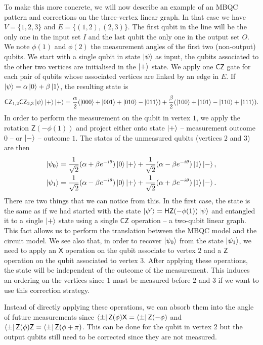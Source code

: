 \documentclass[12pt]{iopart}
\newcommand{\cptp}[1]{\mathsf{#1}} \newcommand{\pd}[1]{\mathcal{#1}}  \newcommand{\sch}[1]{\bm{#1}}
\newcommand{\X}{\cptp{X}}
\newcommand{\Z}{\cptp{Z}}
\newcommand{\Ha}{\cptp{H}}
\renewcommand{\1}{\mathds{1}}
\newcommand{\CZ}{\mathsf{CZ}}
\begin{document}
To make this more concrete, we will now describe an example of an MBQC pattern and corrections on the three-vertex linear graph. In that case we have $V = \{1, 2, 3\}$ and $E = \{(1, 2), (2, 3)\}$. The first qubit in the line will be the only one in the input set $I$ and the last qubit the only one in the output set $O$. We note $\phi(1)$ and $\phi(2)$ the measurement angles of the first two (non-output) qubits. We start with a single qubit in state $\ket{\psi}$ as input, the qubits associated to the other two vertices are initialised in the $\ket{+}$ state. We apply one $\CZ$ gate for each pair of qubits whose associated vertices are linked by an edge in $E$. If $\ket{\psi} = \alpha \ket{0} + \beta\ket{1}$, the resulting state is
\begin{equation}
\CZ_{1, 2}\CZ_{2, 3}\ket{\psi}\ket{+}\ket{+} = \frac{\alpha}{2}(\ket{000} + \ket{001} + \ket{010} - \ket{011}) + \frac{\beta}{2}(\ket{100} + \ket{101} - \ket{110} + \ket{111}).
\end{equation}
In order to perform the measurement on the qubit in vertex $1$, we apply the rotation $\Z(-\phi(1))$ and project either onto state $\ket{+}$ -- measurement outcome $0$ -- or $\ket{-}$ -- outcome $1$. The states of the unmeasured qubits (vertices $2$ and $3$) are then
\begin{align}
\ket{\psi_0} &= \frac{1}{\sqrt{2}}(\alpha + \beta e^{-i\theta})\ket{0}\ket{+} + \frac{1}{\sqrt{2}}(\alpha - \beta e^{-i\theta})\ket{1}\ket{-},\\
\ket{\psi_1} &= \frac{1}{\sqrt{2}}(\alpha - \beta e^{-i\theta})\ket{0}\ket{+} + \frac{1}{\sqrt{2}}(\alpha + \beta e^{-i\theta})\ket{1}\ket{-}.
\end{align}
There are two things that we can notice from this. In the first case, the state is the same as if we had started with the state $\ket{\psi'} = \Ha\Z(-\phi(1))\ket{\psi}$ and entangled it to a single $\ket{+}$ state using a single $\CZ$ operation -- a two-qubit linear graph. This fact allows us to perform the translation between the MBQC model and the circuit model. We see also that, in order to recover $\ket{\psi_0}$ from the state $\ket{\psi_1}$, we need to apply an $\X$ operation on the qubit associate to vertex $2$ and a $\Z$ operation on the qubit associated to vertex $3$. After applying these operations, the state will be independent of the outcome of the measurement. This induces an ordering on the vertices since $1$ must be measured before $2$ and $3$ if we want to use this correction strategy.

Instead of directly applying these operations, we can absorb them into the angle of future measurements since $\bra{\pm}\Z(\phi)\X = \bra{\pm}\Z(-\phi)$ and $\bra{\pm}\Z(\phi)\Z = \bra{\pm}\Z(\phi + \pi)$. This can be done for the qubit in vertex $2$ but the output qubits still need to be corrected since they are not measured.
\end{document}
